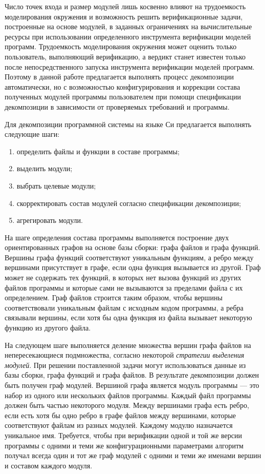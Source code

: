 Число точек входа и размер модулей лишь косвенно влияют на трудоемкость моделирования окружения и возможность решить верификационные задачи, построенные на основе модулей, в заданных ограничениях на вычислительные ресурсы при использовании определенного инструмента верификации моделей программ.
Трудоемкость моделирования окружения может оценить только пользователь, выполняющий верификацию, а вердикт станет известен только после непосредственного запуска инструмента верификации моделей программ.
Поэтому в данной работе предлагается выполнять процесс декомпозиции автоматически, но с возможностью конфигурирования и коррекции состава полученных модулей программы пользователем при помощи спецификации декомпозиции в зависимости от проверяемых требований и программы.

Для декомпозиции программной системы на языке Си предлагается выполнять следующие шаги:
\begin{enumerate}
    \item определить файлы и функции в составе программы;
    \item выделить модули;
    \item выбрать целевые модули;
    \item скорректировать состав модулей согласно спецификации декомпозиции;
    \item агрегировать модули.
\end{enumerate}

На шаге определения состава программы выполняется построение двух ориентированных графов на основе базы сборки: графа файлов и графа функций. 
Вершины графа функций соответствуют уникальным функциям, а ребро между вершинами присутствует в графе, если одна функция вызывается из другой.
Граф может не содержать тех функций, в которых нет вызова функций из других файлов программы и которые сами не вызываются за пределами файла с их определением.
Граф файлов строится таким образом, чтобы вершины соответствовали уникальным файлам с исходным кодом программы, а ребра связывали вершины, если хотя бы одна функция из файла вызывает некоторую функцию из другого файла.

На следующем шаге выполняется деление множества вершин графа файлов на непересекающиеся подмножества, согласно некоторой \textit{стратегии выделения модулей}.
При решении поставленной задачи могут использоваться данные из базы сборки, графа функций и графа файлов.
В результате декомпозиции должен быть получен граф модулей.
Вершиной графа является модуль программы --- это набор из одного или нескольких файлов программы.
Каждый файл программы должен быть частью некоторого модуля.
Между вершинами графа есть ребро, если есть хотя бы одно ребро в графе файлов между вершинами, которые соответствуют файлам из разных модулей.
Каждому модулю назначается уникальное имя.
Требуется, чтобы при верификации одной и той же версии программы с одними и теми же конфигурационными параметрами алгоритм получал всегда один и тот же граф модулей с одними и теми же именами вершин и составом каждого модуля.

